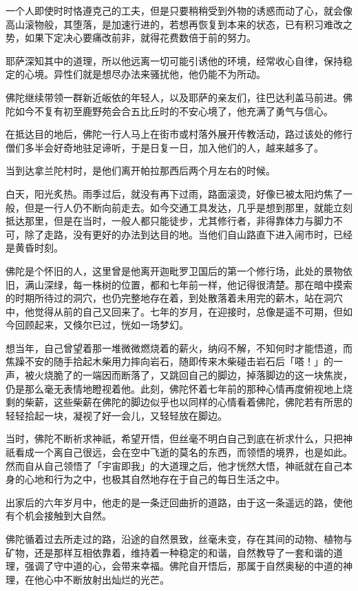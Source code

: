 \documentclass[twoside,openany]{book}
\begin{document}
一个人即使时时恪遵克己的工夫，但是只要稍稍受到外物的诱惑而动了心，就会像高山滚物般，其堕落，是加速行进的，若想再恢复到本来的状态，已有积习难改之势，如果下定决心要痛改前非，就得花费数倍于前的努力。

耶萨深知其中的道理，所以他远离一切可能引诱他的环境，经常收心自律，保持稳定的心境。异性们就是想尽办法来骚扰他，他仍能不为所动。

佛陀继续带领一群新近皈依的年轻人，以及耶萨的亲友们，往巴达利盖马前进。佛陀如今不复有初至鹿野苑会合五比丘时的不安心境了，他充满了勇气与信心。

在抵达目的地后，佛陀一行人马上在街市或村落外展开传教活动，路过该处的修行僧们多半会好奇地驻足谛听，于是日复一日，加入他们的人，越来越多了。

当到达拿兰陀村时，是他们离开帕拉那西后两个月左右的时候。

白天，阳光炙热。雨季过后，就没有再下过雨，路面滚烫，好像已被太阳灼焦了一般，但是一行人仍不断向前走去。如今交通工具发达，几乎是想到那里，就能立刻抵达那里，但是在当时，一般人都只能徒步，尤其修行者，非得靠体力与脚力不可，除了走路，没有更好的办法到达目的地。当他们自山路直下进入闹市时，已经是黄昏时刻。

佛陀是个怀旧的人，这里曾是他离开迦毗罗卫国后的第一个修行场，此处的景物依旧，满山深绿，每一株树的位置，都和七年前一样，他记得很清楚。那在暗中摸索的时期所待过的洞穴，也仍完整地存在着，到处散落着未用完的薪木，站在洞穴中，他觉得从前的自己又回来了。七年的岁月，在迎接时，总像是遥不可期，但如今回顾起来，又倏尔已过，恍如一场梦幻。

想当年，自己曾望着那一堆微微燃烧着的薪火，纳闷不解，不知何时才能悟道，而焦躁不安的随手拾起木柴用力摔向岩石，随即传来木柴碰击岩石后「嗒！」的一声，被火烧脆了的一端因而断落了，又跳回自己的脚边，掉落脚边的这一块焦炭，仍是那么毫无表情地瞪视着他。此刻，佛陀怀着七年前的那种心情再度俯视地上烧剩的柴薪，这些柴薪在佛陀的脚边似乎也以同样的心情看着佛陀，佛陀若有所思的轻轻拾起一块，凝视了好一会儿，又轻轻放在脚边。

当时，佛陀不断祈求神祇，希望开悟，但丝毫不明白自己到底在祈求什么，只把神祇看成一个离自己很远，会在空中飞逝的莫名的东西，而领悟的境界，也是如此。然而自从自己领悟了「宇宙即我」的大道理之后，他才恍然大悟，神祇就在自己本身的心地和行为之中，也极其自然地存在于自己的每日生活之中。

出家后的六年岁月中，他走的是一条迂回曲折的道路，由于这一条遥远的路，使他有个机会接触到大自然。

佛陀循着过去所走过的路，沿途的自然景致，丝毫未变，存在其间的动物、植物与矿物，还是那样互相依靠着，维持着一种稳定的和谐，自然教导了一套和谐的道理，强调了守中道的心，会带来幸福。佛陀自开悟后，那属于自然奥秘的中道的神理，在他心中不断放射出灿烂的光芒。
\end{document}
